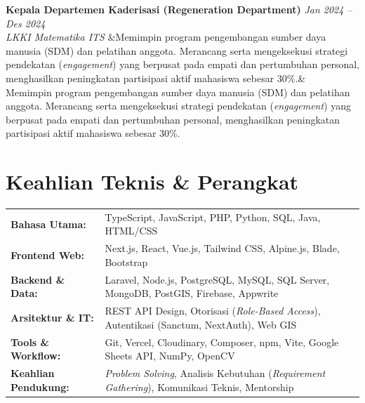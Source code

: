 \documentclass[a4paper,11pt]{article}
\newcommand{\cventry}[4]{%
  \noindent\textbf{#1} \hfill \textit{#3} \\
  \textit{#2}
  \ifx&#4& \else \\ \small #4 \fi
  \vspace{6pt}
}
\begin{document}
\cventry
  {Kepala Departemen Kaderisasi (Regeneration Department)}
  {LKKI Matematika ITS}
  {Jan 2024 -- Des 2024}
  {Memimpin program pengembangan sumber daya manusia (SDM) dan pelatihan anggota. Merancang serta mengeksekusi strategi pendekatan (\textit{engagement}) yang berpusat pada empati dan pertumbuhan personal, menghasilkan peningkatan partisipasi aktif mahasiswa sebesar 30\%.}

\section{Keahlian Teknis \& Perangkat}
\begin{tabularx}{\textwidth}{@{}l X@{}}
\textbf{Bahasa Utama:} & TypeScript, JavaScript, PHP, Python, SQL, Java, HTML/CSS \\[3pt]
\textbf{Frontend Web:} & Next.js, React, Vue.js, Tailwind CSS, Alpine.js, Blade, Bootstrap \\[3pt]
\textbf{Backend \& Data:} & Laravel, Node.js, PostgreSQL, MySQL, SQL Server, MongoDB, PostGIS, Firebase, Appwrite \\[3pt]
\textbf{Arsitektur \& IT:} & REST API Design, Otorisasi (\textit{Role-Based Access}), Autentikasi (Sanctum, NextAuth), Web GIS \\[3pt]
\textbf{Tools \& Workflow:} & Git, Vercel, Cloudinary, Composer, npm, Vite, Google Sheets API, NumPy, OpenCV \\[3pt]
\textbf{Keahlian Pendukung:} & \textit{Problem Solving}, Analisis Kebutuhan (\textit{Requirement Gathering}), Komunikasi Teknis, Mentorship \\
\end{tabularx}
\end{document}

